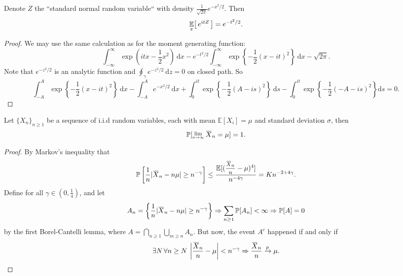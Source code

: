\begin{lemma}
    Denote $Z$ the ``standard normal random variable`` with density $\frac{1}{\sqrt{2\pi}} e^{-x^2/2}$. Then
    \begin{equation}
        \uexp[x]{e^{itZ}} = e^{-t^2/2}.
    \end{equation}
\end{lemma}
\begin{proof}
    We may use the same calculation as for the moment generating function:
    \[
        \int^\infty_{-\infty} \exp \left( itx - \frac{1}{2}x^2 \right) \> \mathrm{d}x 
        - e^{-t^2/2} \int^\infty_{-\infty} \exp \left\{ - \frac{1}{2} (x - it)^2 \right\} \> \mathrm{d}x - \sqrt{2\pi}.
    \]
    Note that $e^{-z^2/2}$ is an analytic function and $\oint_\gamma e^{-z^2/2} \> \mathrm{d}z = 0$ on closed path. So
    \[
        \int^A_{-A} \exp \left\{ -\frac{1}{2}(x - it)^2 \right\} \> \mathrm{d}x - \int^A_{-A} e^{-x^2/2} \> \mathrm{d}x 
        + \int_{0}^{it} \exp \left\{ -\frac{1}{2}(A-is)^2 \right\} \> \mathrm{d}s - \int^{it}_{0} \exp \left\{ - \frac{1}{2} (-A-is)^2 \right\} \mathrm{d}s = 0.
    \]
\end{proof}

\begin{theorem}
    Let $\{X_n\}_{n \geq 1}$ be a sequence of i.i.d random variables, each with mean 
    $\mathbb{E}[X_i] = \mu$ and standard deviation $\sigma$, then 
    \begin{equation}
        \mathbb{P}[\Lim{n \to \infty} \ols{X}_n = \mu] = 1. 
    \end{equation}
\end{theorem}

\begin{proof}
    By Markov's inequality that 
    \[
        \mathbb{P} \left[ \frac{1}{n}|\ols{X}_n - n\mu| \geq n^{-\gamma}\right] 
        \leq \frac{\mathbb{E}[(\mfrac{\ols{X}_n}{n} - \mu)^4]}{n^{-4\gamma}} = Kn^{-2+4\gamma}.
    \]
    Define for all $\gamma \in \left(0, \frac{1}{4}\right)$, and let 
    \[
        A_n = \left\{ \frac{1}{n}|\ols{X}_n - n\mu| \geq n^{-\gamma} \right\} \Rightarrow 
        \sum_{n \geq 1} \mathbb{P}[A_n] < \infty \Rightarrow 
        \mathbb{P}[A] = 0
    \]
    by the first Borel-Cantelli lemma, where $A = \bigcap_{n \geq 1} \bigcup_{m \geq n} A_n$. But now, the event 
    $A^c$ happened if and only if 
    \[
        \exists N\, \forall n \geq N \> \left| \frac{\ols{X}_n}{n} - \mu \right| < n^{-\gamma} 
        \Rightarrow \frac{\ols{X}_n}{n} \xrightarrow[]{p} \mu.
    \]
\end{proof}

